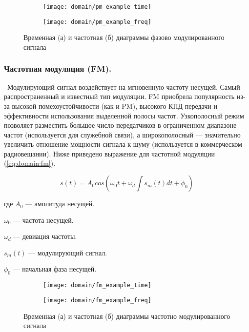 \begin{figure}[h]
  \centering
  \begin{subfigure}{0.45\textwidth}
    \texttt{[image: domain/pm\_example\_time]}
    \caption{}
  \end{subfigure}
  \begin{subfigure}{0.45\textwidth}
    \texttt{[image: domain/pm\_example\_freq]}
    \caption{}
  \end{subfigure}
  \caption{Временная (а) и частотная (б) диаграммы фазово модулированного сигнала}
  \label{fig:domain:pm}
\end{figure}


\subsubsection{Частотная модуляция (FM).}\ Модулирующий сигнал воздействует на мгновенную частоту несущей. Самый распространенный и известный тип модуляции. FM приобрела популярность из-за высокой помехоустойчивости (как и PM), высокого КПД передачи и эффективности использования выделенной полосы частот. Узкополосный режим позволяет разместить большое число передатчиков в ограниченном диапазоне частот (используется для служебной связи), а широкополосный --- значительно увеличить отношение мощности сигнала к шуму (используется в коммерческом радиовещании). Ниже приведено выражение для частотной модуляции (\autoref{eq:domain:fm}).

\begin{equation}
  \label{eq:domain:fm}
  s(t) = A_0 cos(\omega_0 t + \omega_d \int{s_m(t)dt}  + \phi_0)
\end{equation}
\begin{explanation}
\item[где] $A_0$ --- амплитуда несущей.
\item $\omega_0$ --- частота несущей.
\item $\omega_d$ --- девиация частоты.
\item $s_m(t)$ --- модулирующий сигнал.
\item $\phi_0$ --- начальная фаза несущей.
\end{explanation}

\begin{figure}[h]
  \centering
  \begin{subfigure}{0.45\textwidth}
    \texttt{[image: domain/fm\_example\_time]}
    \caption{}
  \end{subfigure}
  \begin{subfigure}{0.45\textwidth}
    \texttt{[image: domain/fm\_example\_freq]}
    \caption{}
  \end{subfigure}
  \caption{Временная (а) и частотная (б) диаграммы частотно модулированного сигнала}
  \label{fig:domain:fm}
\end{figure}


